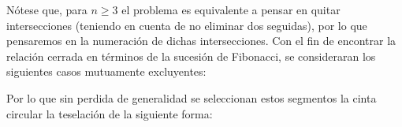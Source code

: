\begin{solution}
    \newcommand\drawRingC[6]{%
  \edef\skipList{,#1,}%
  \begin{scope}[shift={(#2,#3)}]
    \draw[thick,fill=green!30] (0,0) circle (1);
    \draw[thick,fill=white] (0,0) circle (0.7);

    \foreach \a in {0,36,72,108,144,180,216,252,288,324} {
      \edef\angleAsText{,\a,}%
      \IfSubStr{\skipList}{\angleAsText}{%
      }{%
         \draw[thick] (\a:0.7) -- (\a:1);
      }%
    }
    \node at (0:1.15) {\textbf{#4}};
    \node at (36:1.15) {\textbf{#5}};
    \node at (324:1.35) {\textbf{#6}};

    \foreach \a in {72,108,144,180,216,252,288} {
      \edef\angleAsText{,\a,}{%
      }{%
         \draw[fill=black] (\a:0.85) circle (0.05);
      }%
    }
  \end{scope}
}

\newcommand\drawRectangle[6]{%
  \edef\skipList{,#1,}%
  \begin{scope}[shift={(#2,#3)}]
    \draw[thick,fill=green!30] (0,0) rectangle (5,1);
    \foreach \i in {0,1,...,9} {
      \pgfmathsetmacro{\x}{0.5 * \i}
      \edef\indexAsText{,\i,}%
      \IfSubStr{\skipList}{\indexAsText}{}{%
        \draw[thick] (\x,0) -- (\x,1);
      }%
    }
    \node at (0,1.15) {\textbf{#4}};
    \node at (0.5,1.15) {\textbf{#5}};
    \node at (4.5,1.15) {\textbf{#6}};
    \foreach \i in {2,3,4,5,6,7,8} {
      \pgfmathsetmacro{\x}{0.5 * \i}
      \edef\indexAsText{,\i,}%
      {\indexAsText}{}{%
        \filldraw[black] (\x,0.5) circle (0.05);
      }%
    }
  \end{scope}
}

Nótese que, para $n\geq3$ el problema es equivalente a pensar en quitar intersecciones (teniendo en cuenta de no eliminar dos seguidas), por lo que pensaremos en la numeración de dichas intersecciones. Con el fin de encontrar la relación cerrada en términos de la sucesión de Fibonacci, se consideraran los siguientes casos mutuamente excluyentes:
    \begin{center}
        \shorthandoff{>}
        \shorthandon{>}
      \end{center}
Por lo que sin perdida de generalidad se seleccionan estos segmentos la cinta circular la teselación de la siguiente forma:


\end{solution}
